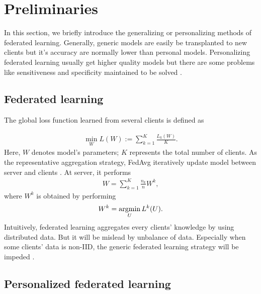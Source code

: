 \documentclass[journal]{IEEEtran}
\begin{document}
\section{Preliminaries}
In this section, we briefly introduce the generalizing or personalizing methods of federated learning. Generally, generic models are easily be transplanted to new clients but it's accuracy are normally lower than personal models. Personalizing federated learning usually get higher quality models but there are some problems like sensitiveness and specificity maintained to be solved \cite{Kulkarni2020SurveyOP}.

\subsection{Federated learning}
The global loss function learned from several clients is defined as

\begin{align}\nonumber
	\min\limits_{W} L(W):=\sum_{k=1}^{K}\frac{L_{k}(W)}{K}.
\end{align}
Here, $W$ denotes model's parameters; $K$ represents the total number of clients. As the representative aggregation strategy,  FedAvg iteratively update model between server and clients \cite{McMahan2016CommunicationEfficientLO}. At server, it performs
\begin{align}
\nonumber
W=\sum_{k=1}^{K}\frac{n_{k}}{n}W^{k},
\end{align} where $W^{k}$ is obtained by performing 
\begin{align}
\nonumber
W^{k} = \argmin_{U} L^{k}(U).
\end{align}
Intuitively, federated learning aggregates every clients' knowledge by using distributed data. But it will be mislead by unbalance of data. Especially when some clients' data is non-IID,  the generic federated learning strategy will be impeded \cite{Li2021FederatedLO}.

\subsection{Personalized federated learning}
\end{document}
